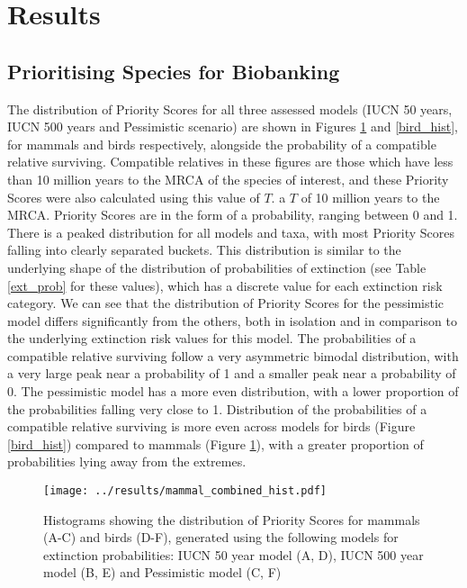 \documentclass[12pt]{article}
\begin{document}
	
	\section{Results}
	\subsection{Prioritising Species for Biobanking}
	The distribution of Priority Scores for all three assessed models (IUCN 50 years,
	IUCN 500 years and Pessimistic scenario) are shown in Figures \ref{mammal_hist}
	and  \ref{bird_hist}, for mammals and birds respectively, alongside the
	probability of a compatible relative surviving. Compatible relatives in these
	figures are those which have less than 10 million years to the MRCA of the
	species of interest, and these Priority Scores were also calculated using this
	value of $T$.
	a $T$ of 10 million years to the MRCA. Priority Scores are in the form
	of a probability, ranging between 0 and 1. There is a peaked
	distribution for all models and taxa, with most Priority Scores falling into
	clearly separated buckets. This distribution is similar to the underlying
	shape of the distribution of probabilities of extinction (see Table \ref{ext_prob}
	for these values), which has a discrete value for each extinction risk
	category. We can see that the distribution of Priority Scores for the
	pessimistic model differs significantly from the others, both in isolation
	and in comparison to the underlying extinction risk values for this model.
	The probabilities of a compatible relative surviving follow a very asymmetric
	bimodal distribution, with a very large peak near a probability of 1 and
	a smaller peak near a probability of 0. The pessimistic
	model has a more even distribution, with a lower proportion of the probabilities
	falling very close to 1. Distribution of the probabilities of a compatible
	relative surviving
	is more even across models for birds (Figure \ref{bird_hist}) compared to
	mammals (Figure \ref{mammal_hist}), with a greater proportion of probabilities
	lying away from the extremes.
	
	
	\begin{figure}
		\texttt{[image: ../results/mammal\_combined\_hist.pdf]}
		\caption{Histograms showing the distribution of Priority Scores for
			mammals (A-C) and birds (D-F), generated using the following models for
			extinction probabilities: IUCN 50 year model (A, D), IUCN 500 year
			model (B, E) and Pessimistic model (C, F)}\label{mammal_hist}
	\end{figure}
	
\end{document}
